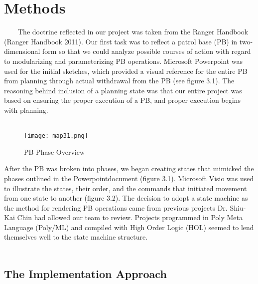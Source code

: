 
\chapter{Methods}
\label{cha:methods}
\ \ \ \ The doctrine reflected in our project was taken from the Ranger Handbook
(Ranger Handbook 2011). Our first task was to reflect a patrol base (PB)
in two-dimensional form so that we could analyze possible courses of action
with regard to modularizing and parameterizing PB operations. Microsoft\textregistered
Powerpoint was used for the initial sketches, which provided a visual
reference for the entire PB from planning through actual withdrawal from
the PB (see figure 3.1). The reasoning behind inclusion of a planning state
was that our entire project was based on ensuring the proper execution of
a PB, and proper execution begins with planning.\ \\\\

\begin{figure}[h]
  \centering
  \texttt{[image: map31.png]}
  \caption{PB Phase Overview}
\end{figure}
After the PB was broken into phases, we began creating states that mimicked
the phases outlined in the Powerpoint\textcopyright document (figure 3.1). Microsoft\textregistered
Visio was used to illustrate the states, their order, and the commands that
initiated movement from one state to another (figure 3.2). The decision to
adopt a state machine as the method for rendering PB operations came from
previous projects Dr. Shiu-Kai Chin had allowed our team to review. Projects
programmed in Poly Meta Language (Poly/ML) and compiled with High Order
Logic (HOL) seemed to lend themselves well to the state machine structure.\\ \\


\section{The Implementation Approach}
\label{sec:impl-appr}


